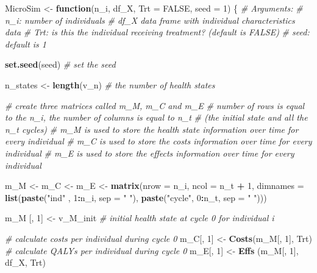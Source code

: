 \documentclass[
]{article}
\newenvironment{Shaded}{\begin{snugshade}}{\end{snugshade}}
\newcommand{\CommentTok}[1]{\textcolor[rgb]{0.56,0.35,0.01}{\textit{#1}}}
\newcommand{\ControlFlowTok}[1]{\textcolor[rgb]{0.13,0.29,0.53}{\textbf{#1}}}
\newcommand{\DataTypeTok}[1]{\textcolor[rgb]{0.13,0.29,0.53}{#1}}
\newcommand{\DecValTok}[1]{\textcolor[rgb]{0.00,0.00,0.81}{#1}}
\newcommand{\KeywordTok}[1]{\textcolor[rgb]{0.13,0.29,0.53}{\textbf{#1}}}
\newcommand{\NormalTok}[1]{#1}
\newcommand{\OperatorTok}[1]{\textcolor[rgb]{0.81,0.36,0.00}{\textbf{#1}}}
\newcommand{\OtherTok}[1]{\textcolor[rgb]{0.56,0.35,0.01}{#1}}
\newcommand{\StringTok}[1]{\textcolor[rgb]{0.31,0.60,0.02}{#1}}
\begin{document}
\begin{Shaded}
\begin{Highlighting}[]
\NormalTok{MicroSim <-}\StringTok{ }\ControlFlowTok{function}\NormalTok{(n_i, df_X, }\DataTypeTok{Trt =} \OtherTok{FALSE}\NormalTok{, }\DataTypeTok{seed =} \DecValTok{1}\NormalTok{) \{}
\CommentTok{# Arguments:  }
  \CommentTok{# n_i:     number of individuals}
    \CommentTok{# df_X     data frame with individual characteristics data }
    \CommentTok{# Trt:     is this the individual receiving treatment? (default is FALSE)}
  \CommentTok{# seed:    default is 1}
  
  \KeywordTok{set.seed}\NormalTok{(seed) }\CommentTok{# set the seed}
  
\NormalTok{  n_states <-}\StringTok{ }\KeywordTok{length}\NormalTok{(v_n) }\CommentTok{# the number of health states}
  
  \CommentTok{# create three matrices called m_M, m_C and m_E}
  \CommentTok{# number of rows is equal to the n_i, the number of columns is equal to n_t  }
  \CommentTok{# (the initial state and all the n_t cycles)}
  \CommentTok{# m_M is used to store the health state information over time for every individual}
  \CommentTok{# m_C is used to store the costs information over time for every individual}
  \CommentTok{# m_E is used to store the effects information over time for every individual}
  
\NormalTok{  m_M <-}\StringTok{ }\NormalTok{m_C <-}\StringTok{ }\NormalTok{m_E <-}\StringTok{  }\KeywordTok{matrix}\NormalTok{(}\DataTypeTok{nrow =}\NormalTok{ n_i, }\DataTypeTok{ncol =}\NormalTok{ n_t }\OperatorTok{+}\StringTok{ }\DecValTok{1}\NormalTok{, }
                                  \DataTypeTok{dimnames =} \KeywordTok{list}\NormalTok{(}\KeywordTok{paste}\NormalTok{(}\StringTok{"ind"}\NormalTok{  , }\DecValTok{1}\OperatorTok{:}\NormalTok{n_i, }\DataTypeTok{sep =} \StringTok{" "}\NormalTok{), }
                                                     \KeywordTok{paste}\NormalTok{(}\StringTok{"cycle"}\NormalTok{, }\DecValTok{0}\OperatorTok{:}\NormalTok{n_t, }\DataTypeTok{sep =} \StringTok{" "}\NormalTok{)))  }

\NormalTok{    m_M [, }\DecValTok{1}\NormalTok{] <-}\StringTok{ }\NormalTok{v_M_init    }\CommentTok{# initial health state at cycle 0 for individual i}
  
    \CommentTok{# calculate costs per individual during cycle 0}
\NormalTok{    m_C[, }\DecValTok{1}\NormalTok{]  <-}\StringTok{ }\KeywordTok{Costs}\NormalTok{(m_M[, }\DecValTok{1}\NormalTok{], Trt)     }
    \CommentTok{# calculate QALYs per individual during cycle 0}
\NormalTok{    m_E[, }\DecValTok{1}\NormalTok{]  <-}\StringTok{ }\KeywordTok{Effs}\NormalTok{ (m_M[, }\DecValTok{1}\NormalTok{], df_X, Trt)   }
    

\end{Highlighting}
\end{Shaded}
\end{document}
